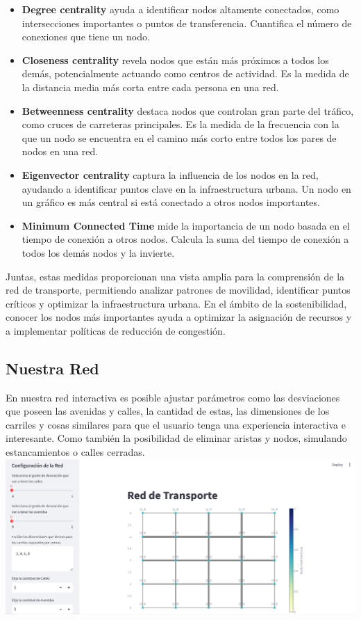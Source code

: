 \documentclass[12pt]{article}
\begin{document}
\begin{itemize}
    \item \textbf{Degree centrality} ayuda a identificar nodos altamente conectados, como intersecciones importantes o puntos de transferencia. Cuantifica el número de conexiones que tiene un nodo.
    \item \textbf{Closeness centrality} revela nodos que están más próximos a todos los demás, potencialmente actuando como centros de actividad. Es la medida de la distancia media más corta entre cada persona en una red.
    \item \textbf{Betweenness centrality} destaca nodos que controlan gran parte del tráfico, como cruces de carreteras principales. Es la medida de la frecuencia con la que un nodo se encuentra en el camino más corto entre todos los pares de nodos en una red.

\item \textbf{Eigenvector centrality} captura la influencia de los nodos en la red, ayudando a identificar puntos clave en la infraestructura urbana. Un nodo en un gráfico es más central si está conectado a otros nodos importantes.
    \item \textbf{Minimum Connected Time} mide la importancia de un nodo basada en el tiempo de conexión a otros nodos. Calcula la suma del tiempo de conexión a todos los demás nodos y la invierte.
\end{itemize}

Juntas, estas medidas proporcionan una vista amplia para la comprensión de la red de transporte, permitiendo analizar patrones de movilidad, identificar puntos críticos y optimizar la infraestructura urbana. En el ámbito de la sostenibilidad, conocer los nodos más importantes ayuda a optimizar la asignación de recursos y a implementar políticas de reducción de congestión.

\subsection{Nuestra Red}

En nuestra red interactiva es posible ajustar parámetros como las desviaciones que poseen las avenidas y calles, la cantidad de estas, las dimensiones de los carriles y cosas similares para que el usuario tenga una experiencia interactiva e interesante. Como también la posibilidad de eliminar aristas y nodos, simulando estancamientos o calles cerradas.\\


\includegraphics[scale=0.5]{imagen.png}
\end{document}
